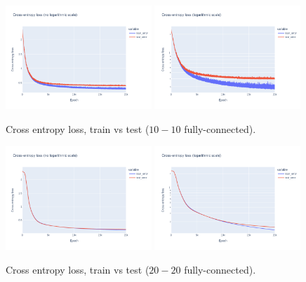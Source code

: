 \documentclass[12pt]{article}
\begin{document}
\begin{figure}[ht]
    \centering
    \includegraphics[width=0.49\textwidth]{images/cross-entropy-comparison-2-10-10.png}
    \includegraphics[width=0.49\textwidth]{images/cross-entropy-comparison-2-10-10-log.png}
    \caption{Cross entropy loss, train vs test ($10-10$ fully-connected).}
    \label{fig: loss comparison 2-10-10}
\end{figure}
\begin{figure}[ht]
    \centering
    \includegraphics[width=0.49\textwidth]{images/cross-entropy-comparison-2-20-20.png}
    \includegraphics[width=0.49\textwidth]{images/cross-entropy-comparison-2-20-20-log.png}
    \caption{Cross entropy loss, train vs test ($20-20$ fully-connected).}
    \label{fig: loss comparison 2-20-20}
\end{figure}
\end{document}
